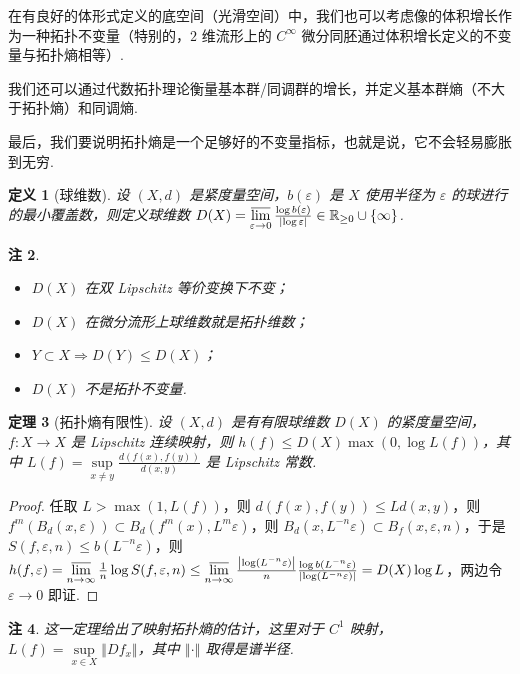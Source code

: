\documentclass[11pt, a4paper, oneside]{ctexart}
\newtheorem{theorem}{定理}[section]
\newtheorem{definition}[theorem]{定义}
\newtheorem{remark}[theorem]{注}
\newcommand{\R}{\mathbb{R}}
\newcommand{\abs}[1]{\left|{#1}\right|}
\newcommand{\norm}[1]{\left\Vert{#1}\right\Vert}
\begin{document}
    在有良好的体形式定义的底空间（光滑空间）中，我们也可以考虑像的体积增长作为一种拓扑不变量（特别的，$2$ 维流形上的 $C^{\infty}$ 微分同胚通过体积增长定义的不变量与拓扑熵相等）.

    我们还可以通过代数拓扑理论衡量基本群/同调群的增长，并定义基本群熵（不大于拓扑熵）和同调熵.

    最后，我们要说明拓扑熵是一个足够好的不变量指标，也就是说，它不会轻易膨胀到无穷.

    \begin{definition}[球维数]
        设 $(X,d)$ 是紧度量空间，$b(\varepsilon)$ 是 $X$ 使用半径为 $\varepsilon$ 的球进行的最小覆盖数，则定义球维数 $D(X)=\varlimsup\limits_{\varepsilon\to 0}\frac{\log b(\varepsilon)}{\abs{\log\varepsilon}}\in\R_{\geq 0}\cup \{\infty\}$.
    \end{definition}
    \begin{remark}
        \begin{itemize}
            \item $D(X)$ 在双 Lipschitz 等价变换下不变；
            \item $D(X)$ 在微分流形上球维数就是拓扑维数；
            \item $Y\subset X\Rightarrow D(Y)\leq D(X)$；
            \item $D(X)$ 不是拓扑不变量.
        \end{itemize}
    \end{remark}

    \begin{theorem}[拓扑熵有限性]
        设 $(X,d)$ 是有有限球维数 $D(X)$ 的紧度量空间，$f:X\to X$ 是 Lipschitz 连续映射，则 $h(f)\leq D(X)\max(0,\log L(f))$，其中 $L(f)=\sup\limits_{x\neq y}\frac{d(f(x),f(y))}{d(x,y)}$ 是 Lipschitz 常数.
    \end{theorem}
    \begin{proof}
        任取 $L>\max(1,L(f))$，则 $d(f(x),f(y))\leq Ld(x,y)$，则 $f^m(B_d(x,\varepsilon))\subset B_d(f^m(x),L^m \varepsilon)$，则 $B_d(x,L^{-n}\varepsilon)\subset B_{f}(x,\varepsilon,n)$，于是 $S(f,\varepsilon,n)\leq b(L^{-n}\varepsilon)$，则 $h(f,\varepsilon)=\varlimsup\limits_{n\to\infty}\frac{1}{n}\log S(f,\varepsilon,n)\leq \varlimsup\limits_{n\to\infty}\frac{\abs{\log(L^{-n}\varepsilon)}}{n}\frac{\log b(L^{-n}\varepsilon)}{\abs{\log(L^{-n}\varepsilon)}}=D(X)\log L$，两边令 $\varepsilon\to 0$ 即证.
    \end{proof}
    \begin{remark}
        这一定理给出了映射拓扑熵的估计，这里对于 $C^1$ 映射，$L(f)=\sup\limits_{x\in X}\norm{Df_x}$，其中 $\norm{\cdot}$ 取得是谱半径.
    \end{remark}
\end{document}

